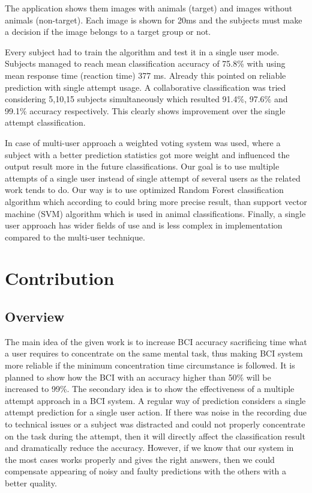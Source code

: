 \documentclass[12pt]{article}
\theoremstyle{definition}
\begin{document}
The application shows them images with animals (target) and images without animals (non-target). Each image is shown for 20ms and the subjects must make a decision if the image belongs to a target group or not.

Every subject had to train the algorithm and test it in a single user mode. Subjects managed to reach mean classification accuracy of 75.8\% with using mean response time (reaction time) 377 ms. Already this pointed on reliable prediction with single attempt usage. A collaborative classification was tried considering 5,10,15 subjects simultaneously which resulted 91.4\%, 97.6\% and 99.1\% accuracy respectively. This clearly shows improvement over the single attempt classification. 

In case of multi-user approach a weighted voting system was used, where a subject with a better prediction statistics got more weight and influenced the output result more in the future classifications. Our goal is to use multiple attempts of a single user instead of single attempt of several users as the related work tends to do. Our way is to use optimized Random Forest classification algorithm which according to \cite{masso} could bring more precise result, than support vector machine (SVM) algorithm which is used in animal classifications. Finally, a single user approach has wider fields of use and is less complex in implementation compared to the multi-user technique.

\newpage
\section{Contribution}

\subsection{Overview}
The main idea of the given work is to increase BCI accuracy sacrificing time what a user requires to concentrate on the same mental task, thus making BCI system more reliable if the minimum concentration time circumstance is followed. It is planned to show how the BCI with an accuracy higher than 50\% will be increased to 99\%.
The secondary idea is to show the effectiveness of a multiple attempt approach in a BCI system. 
A regular way of prediction considers a single attempt prediction for a single user action. If there was noise in the recording due to technical issues or a subject was distracted and could not properly concentrate on the task during the attempt, then it will directly affect the classification result and dramatically reduce the accuracy. However, if we know that our system in the most cases works properly and gives the right answers, then we could compensate appearing of noisy and faulty predictions with the others with a better quality.
\end{document}
